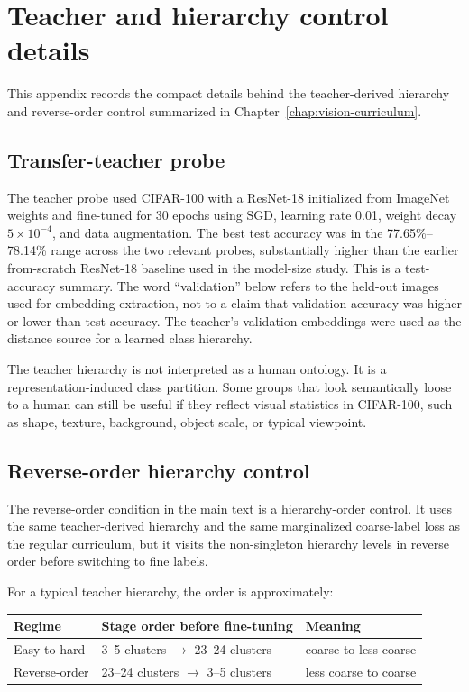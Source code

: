 \chapter{Teacher and hierarchy control details}
\label{app:teacher-hierarchy-details}
\label{app:teacher-transfer-probe}

This appendix records the compact details behind the teacher-derived hierarchy
and reverse-order control summarized in Chapter~\ref{chap:vision-curriculum}.

\section{Transfer-teacher probe}

The teacher probe used CIFAR-100 with a ResNet-18 initialized from ImageNet
weights and fine-tuned for 30 epochs using SGD, learning rate 0.01, weight decay
\(5\times 10^{-4}\), and data augmentation. The best test accuracy was in the
77.65\%--78.14\% range across the two relevant probes, substantially higher
than the earlier from-scratch ResNet-18 baseline used in the model-size study.
This is a test-accuracy summary. The word ``validation'' below refers to the
held-out images used for embedding extraction, not to a claim that validation
accuracy was higher or lower than test accuracy. The teacher's validation
embeddings were used as the distance source for a learned class hierarchy.

The teacher hierarchy is not interpreted as a human ontology. It is a
representation-induced class partition. Some groups that look semantically loose
to a human can still be useful if they reflect visual statistics in CIFAR-100,
such as shape, texture, background, object scale, or typical viewpoint.

\section{Reverse-order hierarchy control}

The reverse-order condition in the main text is a hierarchy-order control. It
uses the same teacher-derived hierarchy and the same marginalized coarse-label
loss as the regular curriculum, but it visits the non-singleton hierarchy levels
in reverse order before switching to fine labels.

For a typical teacher hierarchy, the order is approximately:

\begin{center}
\begin{tabular}{lll}
\toprule
Regime & Stage order before fine-tuning & Meaning \\
\midrule
Easy-to-hard & 3--5 clusters $\rightarrow$ 23--24 clusters & coarse to less coarse \\
Reverse-order & 23--24 clusters $\rightarrow$ 3--5 clusters & less coarse to coarse \\
\bottomrule
\end{tabular}
\end{center}

